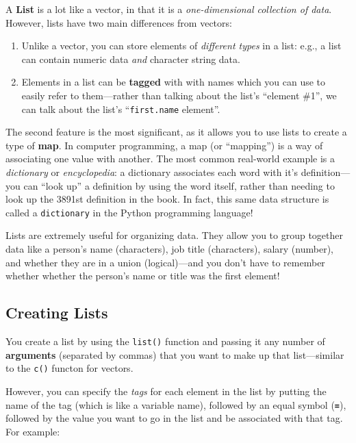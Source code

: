 \documentclass[]{book}
\theoremstyle{definition}
\theoremstyle{definition}
\theoremstyle{remark}
\begin{document}
A \textbf{List} is a lot like a vector, in that it is a
\emph{one-dimensional collection of data}. However, lists have two main
differences from vectors:

\begin{enumerate}
\def\labelenumi{\arabic{enumi}.}
\item
  Unlike a vector, you can store elements of \emph{different types} in a
  list: e.g., a list can contain numeric data \emph{and} character
  string data.
\item
  Elements in a list can be \textbf{tagged} with with names which you
  can use to easily refer to them---rather than talking about the list's
  ``element \#1'', we can talk about the list's ``\texttt{first.name}
  element''.
\end{enumerate}

The second feature is the most significant, as it allows you to use
lists to create a type of \textbf{map}. In computer programming, a map
(or ``mapping'') is a way of associating one value with another. The
most common real-world example is a \emph{dictionary} or
\emph{encyclopedia}: a dictionary associates each word with it's
definition---you can ``look up'' a definition by using the word itself,
rather than needing to look up the 3891st definition in the book. In
fact, this same data structure is called a \texttt{dictionary} in the
Python programming language!

Lists are extremely useful for organizing data. They allow you to group
together data like a person's name (characters), job title (characters),
salary (number), and whether they are in a union (logical)---and you
don't have to remember whether whether the person's name or title was
the first element!

\subsection{Creating Lists}\label{creating-lists}

You create a list by using the \texttt{list()} function and passing it
any number of \textbf{arguments} (separated by commas) that you want to
make up that list---similar to the \texttt{c()} functon for vectors.

However, you can specify the \emph{tags} for each element in the list by
putting the name of the tag (which is like a variable name), followed by
an equal symbol (\textbf{\texttt{=}}), followed by the value you want to
go in the list and be associated with that tag. For example:
\end{document}
